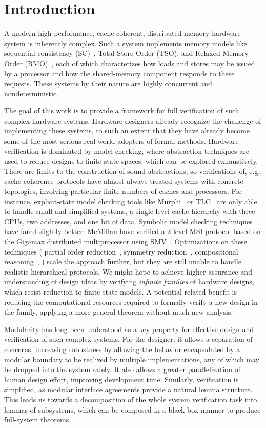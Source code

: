 \section{Introduction}
\label{sec:Introduction}

A modern high-performance, cache-coherent, distributed-memory hardware system is
inherently complex. Such a system implements memory models like sequential
consistency (SC)~\cite{lamport1979make}, Total Store Order (TSO), and
Relaxed Memory Order (RMO)~\cite{weaver1994sparc}, each
of which characterizes how loads and stores may be issued by a processor and
how the shared-memory component responds to these requests.  These systems by
their nature are highly concurrent and nondeterministic.

The goal of this work is to provide a framework for full verification of such
complex hardware systems. Hardware designers already recognize the challenge of
implementing these systems, to such an extent that they have already become some
of the most serious real-world adopters of formal methods.  Hardware
verification is dominated by model-checking, where abstraction techniques are
used to reduce designs to finite state spaces, which can be explored
exhaustively.  There are limits to the construction of sound abstractions, so
verifications of, e.g., cache-coherence protocols have almost always treated
systems with concrete topologies, involving particular finite numbers of caches
and processors. For instance, explicit-state model checking tools like
Murphi~\cite{murphi} or TLC~\cite{tlc} are only able to handle small and
simplified systems, \eg{} a single-level cache hierarchy with three CPUs, two
addresses, and one bit of data. Symbolic model checking techniques have fared
slightly better: McMillan \etal{} have verified a 2-level MSI protocol based on
the Gigamax distributed multiprocessor using SMV~\cite{gigamax}. Optimizations
on these techniques (\eg{} partial order reduction~\cite{part}, symmetry
reduction~\cite{sym1, sym2}, compositional reasoning~\cite{comp}, \etc{}) scale
the approach further, but they are still unable to handle realistic
hierarchical protocols. We might hope to achieve higher assurance and
understanding of design ideas by verifying \emph{infinite families} of hardware
designs, which resist reduction to finite-state models.  A potential related
benefit is reducing the computational resources required to formally verify a
new design in the family, applying a more general theorem without much new
analysis.

Modularity has long been understood as a key property for effective design and
verification of such complex systems. For the designer, it allows a separation
of concerns, increasing robustness by allowing the behavior encapsulated by a
modular boundary to be realized by multiple implementations, any of which may be
dropped into the system safely. It also allows a greater
parallelization of human design effort, improving development time. Similarly, verification is
simplified, as modular interface agreements provide a natural lemma structure.
This leads us towards a decomposition of the whole system verification
task into lemmas of subsystems, which can be composed in a black-box manner to
produce full-system theorems.


